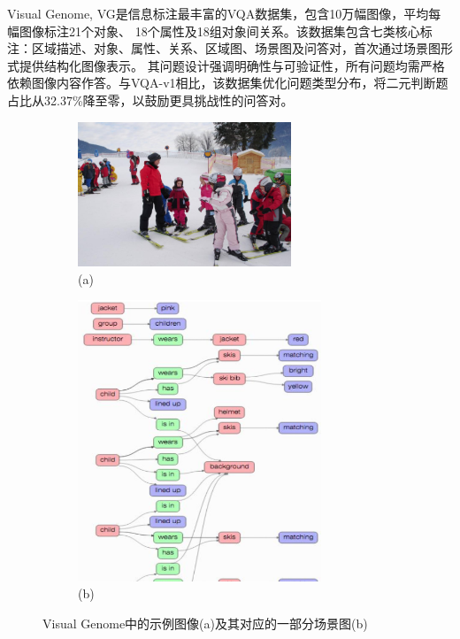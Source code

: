 Visual Genome, VG​\cite{krishna2017visual}是信息标注最丰富的VQA数据集，包含10万幅图像，平均每幅图像标注21个对象、
18个属性及18组对象间关系。该数据集包含七类核心标注：区域描述、对象、属性、关系、区域图、场景图及问答对，首次通过场景图形式提供结构化图像表示。
其问题设计强调明确性与可验证性，所有问题均需严格依赖图像内容作答。与VQA-v1相比，该数据集优化问题类型分布，将二元判断题占比从32.37\%降至零，以鼓励更具挑战性的问答对。

\begin{figure}[htbp]
    \centering
    \begin{subfigure}[b]{0.45\textwidth}
        \centering
        \includegraphics[width=0.7\textwidth, keepaspectratio]{figures/visual-genome-a.png}
        \caption*{(a)}
    \end{subfigure}
    \hfill
    \begin{subfigure}[b]{0.45\textwidth}
        \centering
        \includegraphics[width=0.8\textwidth, keepaspectratio]{figures/visual-genome-b.png}
        \caption*{(b)}
    \end{subfigure}
    \caption{Visual Genome中的示例图像(a)及其对应的一部分场景图(b)}
\end{figure}

